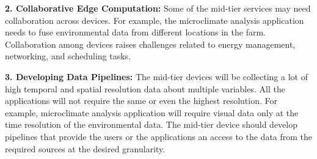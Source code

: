     
    
\noindent\textbf{2. Collaborative Edge Computation:} Some of the mid-tier services may need collaboration across devices. For example, the microclimate analysis application needs to fuse environmental data from different locations in the farm. Collaboration among devices raises challenges related to energy management, networking, and scheduling tasks. 

\noindent\textbf{3. Developing Data Pipelines:} The mid-tier devices will be collecting a lot of high temporal and spatial resolution data about multiple variables. All the applications will not require the same or even the highest resolution. For example, microclimate analysis application will require visual data only at the time resolution of the environmental data. The mid-tier device should develop pipelines that provide the users or the applications an access to the data from the required sources at the desired granularity. 
    




